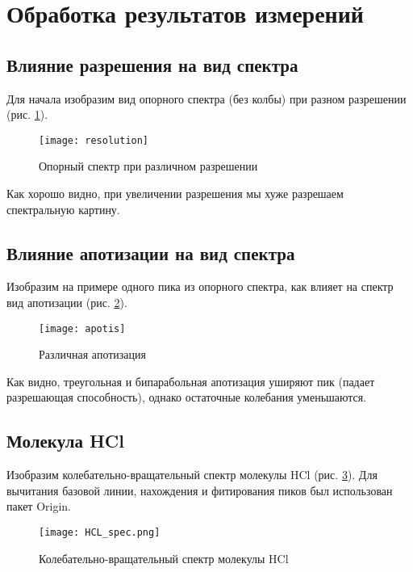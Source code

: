\newpage
\section{Обработка результатов измерений}
\subsection{Влияние разрешения на вид спектра}
Для начала изобразим вид опорного спектра (без колбы) при разном разрешении (рис. \ref{resolution}).
\begin{figure}[h!]
	\centering
	\texttt{[image: resolution]}
	\caption{Опорный спектр при различном разрешении}
	\label{resolution}
\end{figure}

Как хорошо видно, при увеличении разрешения мы хуже разрешаем спектральную картину.
\subsection{Влияние апотизации на вид спектра}
Изобразим на примере одного пика из опорного спектра, как влияет на спектр вид апотизации (рис. \ref{apotis}).
\begin{figure}[h!]
	\centering
	\texttt{[image: apotis]}
	\caption{Различная апотизация}
	\label{apotis}
\end{figure}

Как видно, треугольная и бипарабольная апотизация уширяют пик (падает разрешающая способность), однако остаточные колебания уменьшаются.
\subsection{Молекула HCl}
Изобразим колебательно-вращательный спектр молекулы HCl (рис. \ref{HCL_spec}). Для вычитания базовой линии, нахождения и фитирования пиков был использован пакет Origin.
\vspace{5cm}
\begin{figure}[h!]
	\centering
	\texttt{[image: HCL\_spec.png]}
	\caption{Колебательно-вращательный спектр молекулы HCl}
	\label{HCL_spec}
\end{figure}

